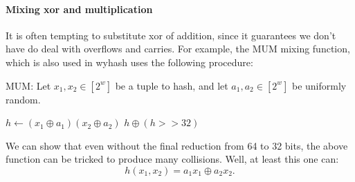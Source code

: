 \paragraph{Mixing xor and multiplication}

It is often tempting to substitute xor of addition, since it guarantees we don't have do deal with overflows and carries.
For example, the MUM mixing function, which is also used in wyhash uses the following procedure:
\begin{algorithm}[H]
   \caption{
      MUM:
      Let $x_1,x_2\in [2^w]$ be a tuple to hash, and let $a_1,a_2\in[2^w]$ be uniformly random.
   }
   \begin{algorithmic}
      \State $h\gets (x_1 \oplus a_1)(x_2 \oplus a_2)$
      \State \Return $h \oplus (h >> 32)$
   \end{algorithmic}
\end{algorithm}
We can show that even without the final reduction from 64 to 32 bits, the above function can be tricked to produce many collisions.
Well, at least this one can:
\[
   h(x_1, x_2) = a_1 x_1 \oplus a_2 x_2.
\]
